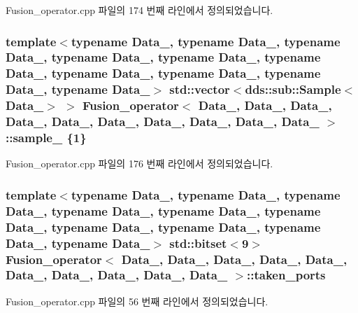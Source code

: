 Fusion\+\_\+operator.\+cpp 파일의 174 번째 라인에서 정의되었습니다.

\subsubsection[{\texorpdfstring{sample\+\_\+8}{sample_8}}]{\setlength{\rightskip}{0pt plus 5cm}template$<$typename Data\+\_, typename Data\+\_, typename Data\+\_, typename Data\+\_, typename Data\+\_, typename Data\+\_, typename Data\+\_, typename Data\+\_, typename Data\+\_, typename Data\+\_$>$ std\+::vector$<$dds\+::sub\+::\+Sample$<$Data\+\_$>$ $>$ {\bf Fusion\+\_\+operator}$<$ Data\+\_, Data\+\_, Data\+\_, Data\+\_, Data\+\_, Data\+\_, Data\+\_, Data\+\_, Data\+\_, Data\+\_ $>$\+::sample\+\_ \{1\}}\hypertarget{classFusion__operator_ad74fbf7634ca557dc8e590487b21b283}{}\label{classFusion__operator_ad74fbf7634ca557dc8e590487b21b283}


Fusion\+\_\+operator.\+cpp 파일의 176 번째 라인에서 정의되었습니다.

\subsubsection[{\texorpdfstring{taken\+\_\+ports}{taken_ports}}]{\setlength{\rightskip}{0pt plus 5cm}template$<$typename Data\+\_, typename Data\+\_, typename Data\+\_, typename Data\+\_, typename Data\+\_, typename Data\+\_, typename Data\+\_, typename Data\+\_, typename Data\+\_, typename Data\+\_$>$ std\+::bitset$<$9$>$ {\bf Fusion\+\_\+operator}$<$ Data\+\_, Data\+\_, Data\+\_, Data\+\_, Data\+\_, Data\+\_, Data\+\_, Data\+\_, Data\+\_, Data\+\_ $>$\+::taken\+\_\+ports}\hypertarget{classFusion__operator_a29bdb5e13d8f8adf00ffcfcbca60fcf4}{}\label{classFusion__operator_a29bdb5e13d8f8adf00ffcfcbca60fcf4}


Fusion\+\_\+operator.\+cpp 파일의 56 번째 라인에서 정의되었습니다.

